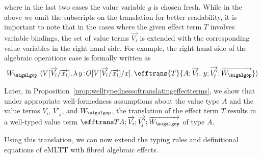 \begin{definition}
where in the last two cases the value variable $y$ is chosen fresh. While in the above we omit the subscripts on the translation for better readability, it is important to note that in the cases where the given effect term $T$ involves variable bindings, the set of value terms $\overrightarrow{V_i}$ is extended with the corresponding value variables in the right-hand side. For example, the right-hand side of the algebraic operations case is formally written as
\[
W_{\sigalgop}\,\, \langle V[\overrightarrow{V_i}/\overrightarrow{x_i}] , \lambda\, y \!:\! O[V[\overrightarrow{V_i}/\overrightarrow{x_i}]/x] .\, \efftrans {T} {A; \overrightarrow{V_i},\, y; \overrightarrow{V'_{\!j}}; \overrightarrow{W_{\sigalgop}}}\rangle
\]
\end{definition}


Later, in Proposition~\ref{prop:welltypednessoftranslatingeffectterms}, we show that under appropriate well-formedness assumptions about the value type $A$ and the value terms $V_i$, $V'_{\!j}$,  and $W_{\sigalgop}$, the translation of the effect term $T$ results in a well-typed value term $\efftrans T {A; \overrightarrow{V_i}; \overrightarrow{V'_{\!j}}; \overrightarrow{W_{\sigalgop}}}$ of type $A$. 


Using this translation, we can now extend the typing rules and definitional equations of eMLTT with fibred algebraic effects.

